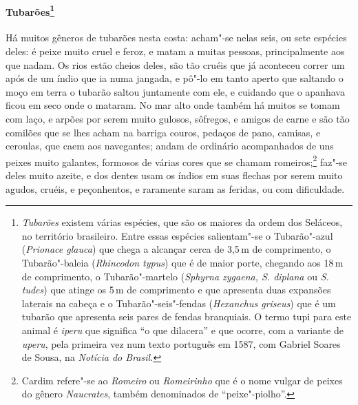 \paragraph{Tubarões\footnote{ \textit{Tubarões} existem várias
espécies, que são os maiores da ordem dos Seláceos, no território
brasileiro. Entre essas espécies salientam"-se o Tubarão"-azul
(\textit{Prionace glauca}) que chega a alcançar cerca de 3,5\,m de
comprimento, o Tubarão"-baleia (\textit{Rhincodon typus}) que é de
maior porte, chegando aos 18\,m de comprimento, o Tubarão"-martelo
(\textit{Sphyrna zygaena, S. diplana} ou \textit{S. tudes}) que
atinge os 5\,m de comprimento e que apresenta duas expansões laterais
na cabeça e o Tubarão"-seis"-fendas (\textit{Hexanchus griseus}) que é
um tubarão que apresenta seis pares de fendas branquiais. O termo tupi
para este animal é \textit{iperu} que significa ``o que dilacera'' e
que ocorre, com a variante de \textit{uperu}, pela primeira vez num
texto português em 1587, com Gabriel Soares de Sousa, na
\textit{Notícia do Brasil.}}} Há muitos gêneros de tubarões
nesta costa: acham"-se nelas seis, ou sete espécies deles: é peixe muito
cruel e feroz, e matam a muitas pessoas, principalmente aos que nadam.
Os rios estão cheios deles, são tão cruéis que já aconteceu correr um
após de um índio que ia numa jangada, e pô"-lo em tanto aperto que
saltando o moço em terra o tubarão saltou juntamente com ele, e
cuidando que o apanhava ficou em seco onde o mataram. No mar alto onde
também há muitos se tomam com laço, e arpões por serem muito gulosos,
sôfregos, e amigos de carne e são tão comilões que se lhes acham na
barriga couros, pedaços de pano, camisas, e ceroulas, que caem aos
navegantes; andam de ordinário acompanhados de uns peixes muito
galantes, formosos de várias cores que se chamam romeiros;\footnote{ Cardim 
refere"-se ao \textit{Romeiro} ou \textit{Romeirinho} que é o
nome vulgar de peixes do gênero \textit{Naucrates}, também denominados
de ``peixe"-piolho''.} faz"-se deles muito azeite, e dos dentes usam os
índios em suas flechas por serem muito agudos, cruéis, e peçonhentos, e
raramente saram as feridas, ou com dificuldade.

